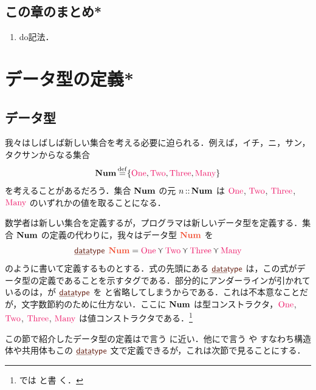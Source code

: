 \documentclass[a5paper,twoside,fleqn,draft]{jsbook}
\begin{document}
\section{この章のまとめ*}

\begin{enumerate}
\item do記法．
\end{enumerate}

\chapter{データ型の定義*}
\label{ch:data-type}

\section{データ型}

我々はしばしば新しい集合を考える必要に迫られる．例えば，イチ，ニ，サン，タクサンからなる集合
\begin{equation}
\mSet{Num}\mDefEq\{\mNumOne,\mNumTwo,\mNumThree,\mNumMany\}
\end{equation}
を考えることがあるだろう．集合 $\mathbf{Num}$ の元 $n\operatorname{{:\!:}}\mathbf{Num}$ は $\mNumOne$, $\mNumTwo$, $\mNumThree$, $\mNumMany$ のいずれかの値を取ることになる．

数学者は新しい集合を定義するが，\haskell プログラマは新しいデータ型を定義する．集合 $\mathbf{Num}$ の定義の代わりに，我々はデータ型
$\mType{Num}$ を
\begin{equation}
  \mDataType\;\mType{Num}
  =\mNumOne\mValueOr\mNumTwo\mValueOr\mNumThree\mValueOr\mNumMany
\end{equation}
のように書いて定義するものとする．式の先頭にある $\mDataType$ は，この式がデータ型の定義であることを示すタグである．部分的にアンダーラインが引かれているのは，\haskell が $\mDataType$ を  と省略してしまうからである．これは不本意なことだが，文字数節約のために仕方ない．ここに $\mathbf{Num}$ は型コンストラクタ，$\mNumOne$, $\mNumTwo$, $\mNumThree$, $\mNumMany$ は値コンストラクタである．\footnote{\haskell では  と書
  く．}


この節で紹介したデータ型の定義は\clang で言う  に近い．他に\clang で言う  や  すなわち構造体や共用体もこの $\mDataType$ 文で定義できるが，これは次節で見ることにする．

\separator
\end{document}
